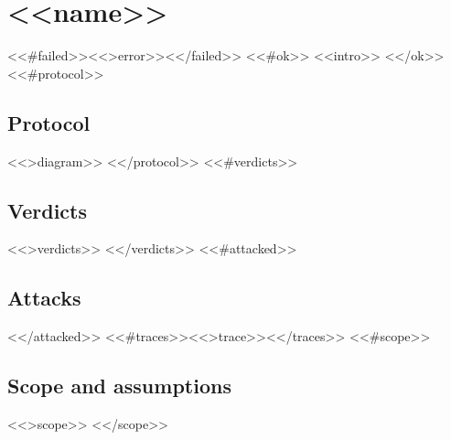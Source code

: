 \section{\texorpdfstring{<<name>>}{<<nameplain>>}}
\label{sec:<<slug>>}
<<#failed>><<>error>><</failed>>
<<#ok>>
\noindent <<intro>>
<</ok>>
<<#protocol>>
\subsection{Protocol}
<<>diagram>>
<</protocol>>
<<#verdicts>>
\subsection{Verdicts}
<<>verdicts>>
<</verdicts>>
<<#attacked>>
\subsection{Attacks}
<</attacked>>
<<#traces>><<>trace>><</traces>>
<<#scope>>
\subsection{Scope and assumptions}
<<>scope>>
<</scope>>
